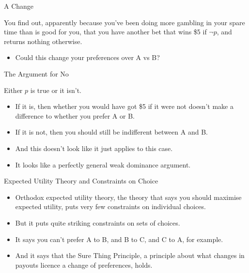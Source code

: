 \documentclass[
  ignorenonframetext,
]{beamer}
\providecommand{\tightlist}{%
  \setlength{\itemsep}{0pt}\setlength{\parskip}{0pt}}
\renewcommand{\,}{\text{, }}
\begin{document}
\begin{frame}{A Change}
\protect\hypertarget{a-change}{}

You find out, apparently because you've been doing more gambling in your
spare time than is good for you, that you have another bet that wins \$5
if \(\neg p\), and returns nothing otherwise.

\begin{itemize}
\tightlist
\item
  Could this change your preferences over A vs B?
\end{itemize}

\end{frame}

\begin{frame}{The Argument for No}
\protect\hypertarget{the-argument-for-no}{}

Either \(p\) is true or it isn't.

\begin{itemize}
\tightlist
\item
  If it is, then whether you would have got \$5 if it were not doesn't
  make a difference to whether you prefer A or B.
\item
  If it is not, then you should still be indifferent between A and B.
\item
  And this doesn't look like it just applies to this case.
\item
  It looks like a perfectly general weak dominance argument.
\end{itemize}

\end{frame}

\begin{frame}{Expected Utility Theory and Constraints on Choice}
\protect\hypertarget{expected-utility-theory-and-constraints-on-choice}{}

\begin{itemize}
\tightlist
\item
  Orthodox expected utility theory, the theory that says you should
  maximise expected utility, puts very few constraints on individual
  choices.
\item
  But it puts quite striking constraints on sets of choices.
\item
  It says you can't prefer A to B, and B to C, and C to A, for example.
\item
  And it says that the Sure Thing Principle, a principle about what
  changes in payouts licence a change of preferences, holds.
\end{itemize}

\end{frame}
\end{document}
